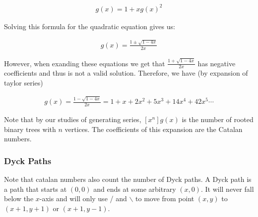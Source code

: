 \documentclass{report}
\begin{document}
{{    \begin{align*}
        g(x) = 1 + xg(x)^2
    \end{align*}

    Solving this formula for the quadratic equation gives us:

    \begin{align*}
        g(x) = \frac{1 \pm \sqrt{1 - 4x}}{2x}
    \end{align*}

    However, when exanding these equations we get that $\frac{1 + \sqrt{1 - 4x}}{2x}$ has
    negative coefficients and thus is not a valid solution. Therefore, we have
    (by expansion of taylor series)

    \begin{align*}
        g(x) = \frac{1 - \sqrt{1 - 4x}}{2x} = 1 + x + 2x^2 + 5x^3 + 14x^4 + 42x^5 \cdots
    \end{align*}

    Note that by our studies of generating series, $[x^n]g(x)$ is the number of rooted
    binary trees with $n$ vertices. The coefficients of this expansion are the Catalan
    numbers.
}

\subsubsection*{Dyck Paths}

Note that catalan numbers also count the number of Dyck paths. A Dyck path is a path
that starts at $(0,0)$ and ends at some arbitrary $(x,0)$. It will never fall below
the $x$-axis and will only use / and $\backslash$ to move from point $(x,y)$ to
$(x+1,y+1)$ or $(x+1,y-1)$.



}
\end{document}
